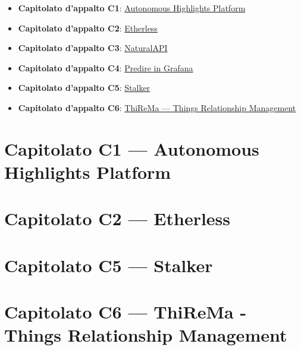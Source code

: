 \documentclass{article}
\begin{document}
\begin{itemize}
  \item \textbf{Capitolato d'appalto C1}: \href{https://www.math.unipd.it/~tullio/IS-1/2019/Progetto/C1.pdf}{Autonomous Highlights Platform}
  \item \textbf{Capitolato d'appalto C2}: \href{https://www.math.unipd.it/~tullio/IS-1/2019/Progetto/C2.pdf}{Etherless}
  \item \textbf{Capitolato d'appalto C3}: \href{https://www.math.unipd.it/~tullio/IS-1/2019/Progetto/C3.pdf}{NaturalAPI}
  \item \textbf{Capitolato d'appalto C4}: \href{https://www.math.unipd.it/~tullio/IS-1/2019/Progetto/C4.pdf}{Predire in Grafana}
  \item \textbf{Capitolato d'appalto C5}: \href{https://www.math.unipd.it/~tullio/IS-1/2019/Progetto/C5.pdf}{Stalker}
  \item \textbf{Capitolato d'appalto C6}: \href{https://www.math.unipd.it/~tullio/IS-1/2019/Progetto/C6.pdf}{ThiReMa --- Things Relationship Management}
\end{itemize}

%

\newpage
\section{Capitolato C1 --- Autonomous Highlights Platform}%
\label{sec:c1}


\newpage
\section{Capitolato C2 --- Etherless}%
\label{sec:c2}


\newpage
\section{Capitolato C5 --- Stalker}%
\label{sec:c5}


\newpage
\section{Capitolato C6 --- ThiReMa - Things Relationship Management}%
\label{sec:c6}

\end{document}
